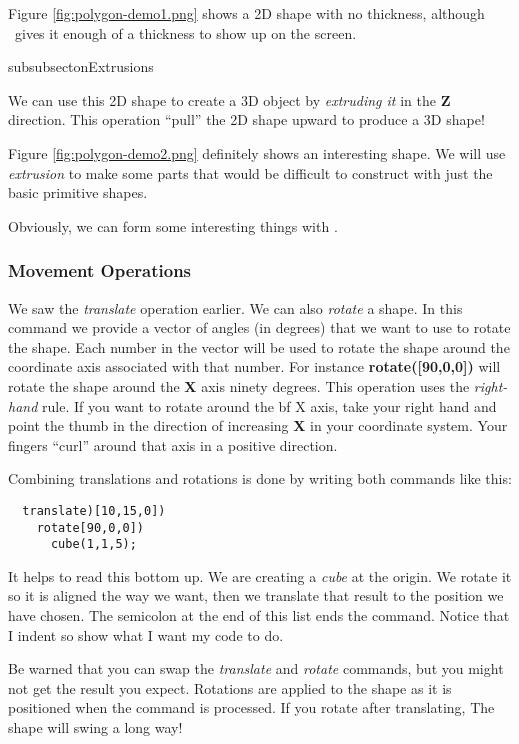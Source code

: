 Figure \ref{fig:polygon-demo1.png} shows a  2D shape with no thickness, although
\osc\ gives it enough of a thickness to show up on the screen.

subsubsecton{Extrusions}

We can use this 2D shape to create a 3D object by {\it extruding it} in the
{\bf Z} direction. This operation ``pull'' the 2D shape upward to produce a 3D
shape!


Figure \ref{fig:polygon-demo2.png} definitely shows an interesting shape. We
will use {\it extrusion} to make some parts that would be difficult to construct
with just the basic primitive shapes.


Obviously, we can form some interesting things with \osc. 

\subsubsection{Movement Operations}

We saw the {\it translate} operation earlier. We can also {\it rotate} a shape.
In this command we provide a vector of angles (in degrees) that we want to use
to rotate the shape. Each number in the vector will be used to rotate the shape
around the coordinate axis associated with that number. For instance {\bf
rotate([90,0,0])} will rotate the shape around the {\bf X} axis ninety degrees.
This operation uses the {\it right-hand} rule. If you want to rotate around the
{bf X} axis, take your right hand and point the thumb in the direction of
increasing {\bf X} in your coordinate system. Your fingers ``curl'' around that
axis in a positive direction.

Combining translations and rotations is done by writing both commands like
this:

\begin{lstlisting}
  translate)[10,15,0])
    rotate[90,0,0])
      cube(1,1,5);
\end{lstlisting}

It helps to read this bottom up. We are creating a {\it cube} at the origin. We
rotate it so it is aligned the way we want, then we translate that result to
the position we have chosen. The semicolon at the end of this list ends the
command. Notice that I indent so show what I want my code to do.

Be warned that you can swap the {\it translate} and {\it rotate} commands, but
you might not get the result you expect. Rotations are applied to the shape as
it is positioned when the command is processed. If you rotate after
translating, The shape will swing a long way!

